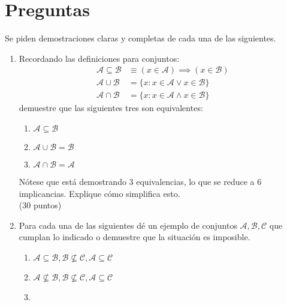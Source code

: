 \documentclass[spanish, fleqn]{article}
\title{Estructuras Discretas \\
       Tarea \#\num \\
       ``¡¿Hay que demostrarlo?!''}
\author{Discrete Structures Warriors}
\date{30 de marzo de 2015}
\begin{document}
\maketitle
\thispagestyle{empty}

\section*{Preguntas}

  Se piden demostraciones claras y completas de cada una de las siguientes.

  \begin{enumerate}
  \item
    Recordando las definiciones para conjuntos:
    \begin{align*}
      \mathcal{A} \subseteq \mathcal{B}
	&\equiv (x \in \mathcal{A}) \implies (x \in \mathcal{B}) \\
      \mathcal{A} \cup \mathcal{B}
	&= \{x \colon x \in \mathcal{A} \vee x \in \mathcal{B} \} \\
      \mathcal{A} \cap \mathcal{B}
	&= \{x \colon x \in \mathcal{A} \wedge x \in \mathcal{B} \}
    \end{align*}
    demuestre que las siguientes tres son equivalentes:
    \begin{enumerate}
    \item
      \(\mathcal{A} \subseteq \mathcal{B}\)
    \item
      \(\mathcal{A} \cup \mathcal{B} = \mathcal{B}\)
    \item
      \(\mathcal{A} \cap \mathcal{B} = \mathcal{A}\)
    \end{enumerate}
    Nótese que está demostrando \(3\) equivalencias,
    lo que se reduce a \(6\) implicancias.
    Explique cómo simplifica esto.
    \\ \hspace*{\fill}(30 puntos)
  \item
    Para cada una de las siguientes
    dé un ejemplo de conjuntos \(\mathcal{A}, \mathcal{B}, \mathcal{C}\)
    que cumplan lo indicado
    o demuestre que la situación es imposible.
    \begin{enumerate}
    \item
      \(\mathcal{A} \subseteq \mathcal{B},
	\mathcal{B} \not\subseteq \mathcal{C},
	\mathcal{A} \subseteq \mathcal{C}\)
    \item
      \(\mathcal{A} \not\subseteq \mathcal{B},
	\mathcal{B} \not\subseteq \mathcal{C},
	\mathcal{A} \subseteq \mathcal{C}\)
    \item

\end{enumerate}
\end{enumerate}
\end{document}
